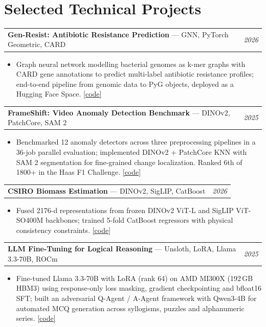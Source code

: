 \documentclass[letterpaper,10pt]{article}
\makeatletter
\newcommand{\codelink}[1]{\href{#1}{[code]}}
\newcommand{\cventry}[2]{%
    \begin{tabularx}{\textwidth}{@{}>{\raggedright\arraybackslash}X@{\hspace{8pt}}>{\raggedleft\arraybackslash}p{1.75in}@{}}
      #1 & \textit{\small #2}
    \end{tabularx}
}
\makeatother
\begin{document}
\section{Selected Technical Projects}

\cventry{\textbf{Gen-Resist: Antibiotic Resistance Prediction} --- GNN, PyTorch Geometric, CARD}{2026}
\begin{itemize}[leftmargin=0.2in, itemsep=1pt, topsep=2pt, parsep=0pt]
  \item \small Graph neural network modelling bacterial genomes as k-mer graphs with CARD gene annotations to predict multi-label antibiotic resistance profiles; end-to-end pipeline from genomic data to PyG objects, deployed as a Hugging Face Space. \codelink{https://github.com/Manan-Wadhwa/gen_resist}
\end{itemize}

\vspace{3pt}
\cventry{\textbf{FrameShift: Video Anomaly Detection Benchmark} --- DINOv2, PatchCore, SAM 2}{2025}
\begin{itemize}[leftmargin=0.2in, itemsep=1pt, topsep=2pt, parsep=0pt]
  \item \small Benchmarked 12 anomaly detectors across three preprocessing pipelines in a 36-job parallel evaluation; implemented DINOv2 + PatchCore KNN with SAM 2 segmentation for fine-grained change localization. Ranked 6th of 1800+ in the Haas F1 Challenge. \codelink{https://github.com/Manan-Wadhwa/FrameShift}
\end{itemize}

\vspace{3pt}
\cventry{\textbf{CSIRO Biomass Estimation} --- DINOv2, SigLIP, CatBoost}{2026}
\begin{itemize}[leftmargin=0.2in, itemsep=1pt, topsep=2pt, parsep=0pt]
  \item \small Fused 2176-d representations from frozen DINOv2 ViT-L and SigLIP ViT-SO400M backbones; trained 5-fold CatBoost regressors with physical consistency constraints. \codelink{https://github.com/Manan-Wadhwa/csiro}
\end{itemize}

\vspace{3pt}
\cventry{\textbf{LLM Fine-Tuning for Logical Reasoning} --- Unsloth, LoRA, Llama 3.3-70B, ROCm}{2025}
\begin{itemize}[leftmargin=0.2in, itemsep=1pt, topsep=2pt, parsep=0pt]
  \item \small Fine-tuned Llama 3.3-70B with LoRA (rank 64) on AMD MI300X (192\,GB HBM3) using response-only loss masking, gradient checkpointing and bfloat16 SFT; built an adversarial Q-Agent / A-Agent framework with Qwen3-4B for automated MCQ generation across syllogisms, puzzles and alphanumeric series. \codelink{https://github.com/Manan-Wadhwa/IITD_Feb26_AAIPL}
\end{itemize}
\end{document}
